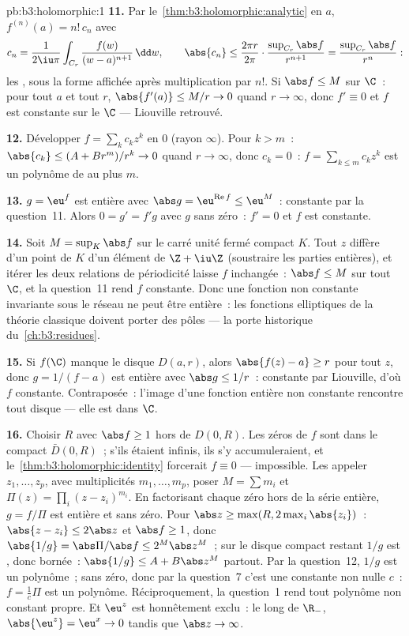 \begin{solution}{pb:b3:holomorphic:1}
\textbf{11.} Par le~\cref{thm:b3:holomorphic:analytic} en
$a$, $f^{(n)}(a) = n!\,c_n$ avec
\[
c_n = \frac1{2\iu\pi}\int_{C_r}\frac{f(w)}{(w -
a)^{n+1}}\,\dd w,
\qquad
\abs{c_n} \leq \frac{2\pi r}{2\pi}\cdot
\frac{\sup_{C_r}\abs f}{r^{n+1}}
= \frac{\sup_{C_r}\abs f}{r^{n}} :
\]
les , sous la forme affichée après
multiplication par $n!$. Si $\abs f \leq M$ sur $\C$~: pour
tout $a$ et tout $r$, $\abs{f'(a)} \leq M/r \to 0$ quand $r
\to \infty$, donc $f' \equiv 0$ et $f$ est constante sur le
 $\C$ --- Liouville retrouvé.

\textbf{12.} Développer $f = \sum_kc_kz^k$ en $0$ (rayon
$\infty$). Pour $k > m$~: $\abs{c_k} \leq (A + Br^m)/r^k \to
0$ quand $r \to \infty$, donc $c_k = 0$~: $f = \sum_{k\leq
m}c_kz^k$ est un polynôme de  au plus $m$.

\textbf{13.} $g = \eu^f$ est entière avec $\abs g =
\eu^{\operatorname{Re}f} \leq \eu^M$~: constante par la
question~11. Alors $0 = g' = f'g$ avec $g$ sans zéro~: $f' =
0$ et $f$ est constante.

\textbf{14.} Soit $M = \sup_K\abs f$ sur le carré unité fermé
compact $K$. Tout $z$ diffère d'un point de $K$ d'un élément
de $\Z + \iu\Z$ (soustraire les parties entières), et
itérer les deux relations de périodicité laisse $f$
inchangée~: $\abs f \leq M$ sur tout $\C$, et la question~11
rend $f$ constante. Donc une fonction non constante
invariante sous le réseau ne peut être entière~: les
fonctions elliptiques de la théorie classique doivent
porter des pôles --- la porte historique
du~\cref{ch:b3:residues}.

\textbf{15.} Si $f(\C)$ manque le disque $D(a, r)$, alors
$\abs{f(z) - a} \geq r$ pour tout $z$, donc $g = 1/(f - a)$
est entière avec $\abs g \leq 1/r$~: constante par
Liouville, d'où $f$ constante. Contraposée~: l'image d'une
fonction entière non constante rencontre tout disque ---
elle est  dans $\C$.

\textbf{16.} Choisir $R$ avec $\abs f \geq 1$ hors de $D(0,
R)$. Les zéros de $f$ sont dans le compact $\bar D(0, R)$~;
s'ils étaient infinis, ils s'y accumuleraient, et
le~\cref{thm:b3:holomorphic:identity} forcerait $f \equiv 0$
--- impossible. Les appeler $z_1, \dots, z_p$, avec
multiplicités $m_1, \dots, m_p$, poser $M = \sum m_i$ et
$\Pi(z) = \prod_i(z - z_i)^{m_i}$. En factorisant chaque
zéro hors de la série entière, $g = f/\Pi$ est entière et
sans zéro. Pour $\abs z \geq \max(R, 2\max_i\abs{z_i})$~:
$\abs{z - z_i} \leq 2\abs z$ et $\abs f \geq 1$, donc
$\abs{1/g} = \abs\Pi/\abs f \leq 2^M\abs z^M$~; sur le
disque compact restant $1/g$ est , donc bornée~:
$\abs{1/g} \leq A + B\abs z^M$ partout. Par la question~12,
$1/g$ est un polynôme~; sans zéro, donc par la question~7
c'est une constante non nulle $c$~: $f = \frac1c\Pi$ est un
polynôme. Réciproquement, la question~1 rend tout polynôme
non constant propre. Et $\eu^z$ est honnêtement exclu~: le
long de $\R_-$, $\abs{\eu^z} = \eu^x \to 0$ tandis que
$\abs z \to \infty$.


\end{solution}
